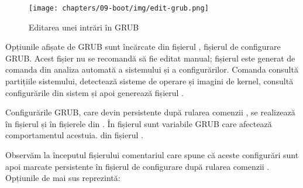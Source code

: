 \begin{figure}[!htbp]
  \centering
  \texttt{[image: chapters/09-boot/img/edit-grub.png]}
  \caption{Editarea unei intrări în GRUB}
  \label{fig:boot:edit-grub}
\end{figure}

Opțiunile afișate de GRUB sunt încărcate din fișierul , fișierul de configurare GRUB.
Acest fișier nu se recomandă să fie editat manual;
fișierul este generat de comanda  din analiza automată a sistemului și a configurărilor.
 Comanda  consultă partițiile sistemului, detectează sisteme de operare și imagini de kernel, consultă configurările din sistem și apoi generează fișierul .

Configurările GRUB, care devin persistente după rularea comenzii , se realizează în fișierul  și în fișierele din .
În fișierul  sunt variabile GRUB care afectează comportamentul acestuia.
 din fișierul .


Observăm la începutul fișierului comentariul care spune că aceste configurări sunt apoi marcate persistente în fișierul de configurare  după rularea comenzii .
Opțiunile de mai sus reprezintă:

